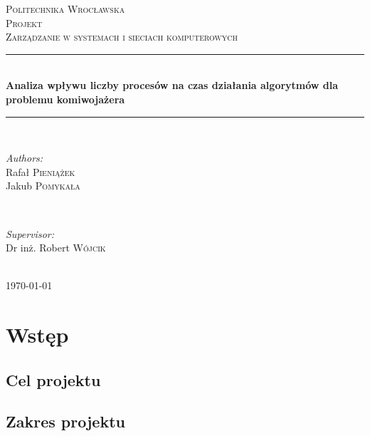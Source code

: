\documentclass{article}
\begin{document}
	
	\begin{titlepage}
		\center
		\newcommand{\HRule}{\rule{\linewidth}{0.5mm}}
		
		\textsc{\LARGE Politechnika Wrocławska}\\[1.5cm]
		\textsc{\Large Projekt}\\[0.5cm] 
		\textsc{\large Zarządzanie w systemach i sieciach komputerowych}\\[0.5cm] 

		\HRule \\[0.4cm]
		{ \huge \bfseries Analiza wpływu liczby procesów na czas działania algorytmów dla problemu komiwojażera}\\[0.4cm]
		\HRule \\[1.5cm]
		
		\begin{minipage}{0.4\textwidth}
			\begin{flushleft} \large
				\emph{Authors:}\\
				Rafał \textsc{Pieniążek} 
				\\ Jakub \textsc{Pomykała}
			\end{flushleft}
		\end{minipage}
		~
		\begin{minipage}{0.4\textwidth}
			\begin{flushright} \large
				\emph{Supervisor:} \\
				Dr inż. Robert \textsc{Wójcik} 
			\end{flushright}
		\end{minipage}\\[4cm]

		{\large \today}\\[3cm]
		
		\vfill
		
	\end{titlepage}

\tableofcontents
\newpage
	
	
	
	
\section{Wstęp}
	\subsection{Cel projektu}
	\subsection {Zakres projektu}
\end{document}
